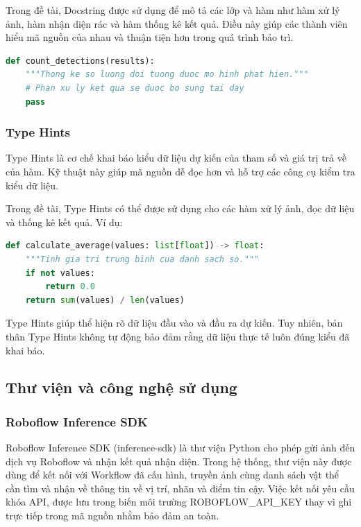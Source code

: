 \documentclass[a4paper,13pt]{extarticle}
\begin{document}
Trong đề tài, Docstring được sử dụng để mô tả các lớp và hàm như hàm xử lý ảnh, hàm nhận diện rác và hàm thống kê kết quả. Điều này giúp các thành viên hiểu mã nguồn của nhau và thuận tiện hơn trong quá trình bảo trì.

\begin{lstlisting}[language=Python, caption={Ví dụ sử dụng Docstring mô tả hàm}]
def count_detections(results):
    """Thong ke so luong doi tuong duoc mo hinh phat hien."""
    # Phan xu ly ket qua se duoc bo sung tai day
    pass
\end{lstlisting}

\subsubsection{Type Hints}
Type Hints là cơ chế khai báo kiểu dữ liệu dự kiến của tham số và giá trị trả về của hàm. Kỹ thuật này giúp mã nguồn dễ đọc hơn và hỗ trợ các công cụ kiểm tra kiểu dữ liệu.

Trong đề tài, Type Hints có thể được sử dụng cho các hàm xử lý ảnh, đọc dữ liệu và thống kê kết quả. Ví dụ:

\begin{lstlisting}[language=Python, caption={Ví dụ về việc sử dụng Type Hints trong hàm tính trung bình}]
def calculate_average(values: list[float]) -> float:
    """Tinh gia tri trung binh cua danh sach so."""
    if not values:
        return 0.0
    return sum(values) / len(values)
\end{lstlisting}

Type Hints giúp thể hiện rõ dữ liệu đầu vào và đầu ra dự kiến. Tuy nhiên, bản thân Type Hints không tự động bảo đảm rằng dữ liệu thực tế luôn đúng kiểu đã khai báo.

\subsection{Thư viện và công nghệ sử dụng}

\subsubsection{Roboflow Inference SDK}

Roboflow Inference SDK (inference-sdk) là thư viện Python cho phép gửi ảnh đến dịch vụ Roboflow và nhận kết quả nhận diện. Trong hệ thống, thư viện này được dùng để kết nối với Workflow đã cấu hình, truyền ảnh cùng danh sách vật thể cần tìm và nhận về thông tin về vị trí, nhãn và điểm tin cậy. Việc kết nối yêu cầu khóa API, được lưu trong biến môi trường ROBOFLOW\_API\_KEY thay vì ghi trực tiếp trong mã nguồn nhằm bảo đảm an toàn.
\end{document}

